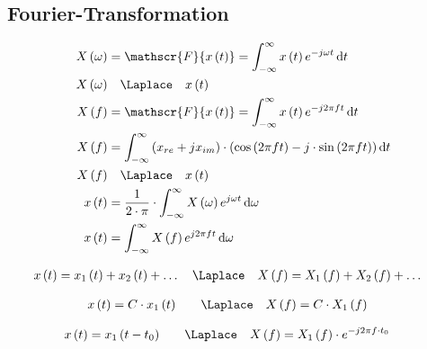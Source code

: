 \subsection{Fourier-Transformation}

\begin{boxleft}
\end{boxleft}\begin{boxrightshaded}
\begin{align*}
X\left(\omega\right)&=\mathscr{F}\{x\left(t\right)\}=\int_{-\infty}^{\infty}x\left(t\right)e^{-j\omega t}\diff t\\
X\left(\omega\right)&\quad\Laplace\quad x\left(t\right)\\
X\left(f\right)&=\mathscr{F}\{x\left(t\right)\}=\int_{-\infty}^{\infty}x\left(t\right)e^{-j2\pi f t}\diff t\\
X\left(f\right)&=\int_{-\infty}^\infty\left(x_{re}+jx_{im}\right)\cdot\left(\cos\left(2\pi f t\right)-j\cdot\sin\left(2\pi f t\right)\right)\diff t\\
X\left(f\right)&\quad\Laplace\quad x\left(t\right)\\
x\left(t\right)&=\frac{1}{2\cdot\pi}\cdot\int_{-\infty}^{\infty}X\left(\omega\right)e^{j\omega t}\diff \omega\\
x\left(t\right)&=\int_{-\infty}^{\infty}X\left(f \right)e^{j2\pi f t}\diff \omega
\end{align*}
\end{boxrightshaded}

\begin{boxleft}
\end{boxleft}\begin{boxrightshaded}
\begin{align*}
x\left(t\right)&=x_1\left(t\right)+x_2\left(t\right)+\dots\quad\Laplace\quad X\left(f\right)=X_1\left(f\right)+X_2\left(f\right)+\dots
\end{align*}
\end{boxrightshaded}

\begin{boxleft}
\end{boxleft}\begin{boxrightshaded}
\begin{align*}
x\left(t\right)&=C\cdot x_1\left(t\right)\quad&\Laplace\quad X\left(f\right)&=C\cdot X_1\left(f\right)
\end{align*}
\end{boxrightshaded}

\begin{boxleft}
\end{boxleft}\begin{boxrightshaded}
\begin{align*}
x\left(t\right)&=x_1\left(t-t_0\right)\quad&\Laplace\quad X\left(f\right)&=X_1\left(f\right)\cdot e^{-j2\pi f\cdot t_0}
\end{align*}
\end{boxrightshaded}


